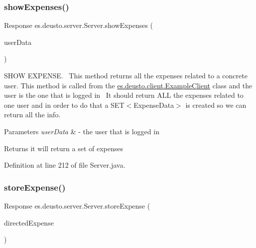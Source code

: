 \subsubsection{\texorpdfstring{show\+Expenses()}{showExpenses()}}
{\footnotesize\ttfamily Response es.\+deusto.\+server.\+Server.\+show\+Expenses (\begin{DoxyParamCaption}\item[{\hyperlink{classes_1_1deusto_1_1serialization_1_1_user_data}{User\+Data}}]{user\+Data }\end{DoxyParamCaption})}

S\+H\+OW E\+X\+P\+E\+N\+SE.~\newline
 This method returns all the expenses related to a concrete user. This method is called from the \hyperlink{classes_1_1deusto_1_1client_1_1_example_client}{es.\+deusto.\+client.\+Example\+Client} class and the user is the one that is logged in~\newline
 It should return A\+LL the expenses related to one user and in order to do that a S\+E\+T$<$\+Expense\+Data$>$ is created so we can return all the info.


\begin{DoxyParams}{Parameters}
{\em user\+Data} & -\/ the user that is logged in \\
\hline
\end{DoxyParams}
\begin{DoxyReturn}{Returns}
it will return a set of expenses 
\end{DoxyReturn}


Definition at line 212 of file Server.\+java.

\mbox{\label{classes_1_1deusto_1_1server_1_1_server_a1a91c5bde8d3b39fc4292dc09d62b61b}} 
\subsubsection{\texorpdfstring{store\+Expense()}{storeExpense()}}
{\footnotesize\ttfamily Response es.\+deusto.\+server.\+Server.\+store\+Expense (\begin{DoxyParamCaption}\item[{\hyperlink{classes_1_1deusto_1_1serialization_1_1_directed_message}{Directed\+Message}}]{directed\+Expense }\end{DoxyParamCaption})}


